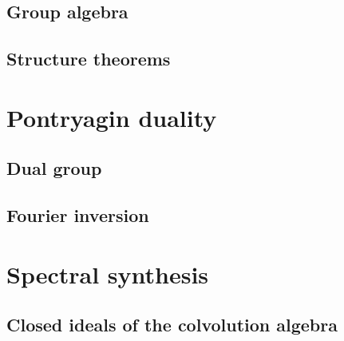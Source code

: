 \documentclass{../note}
\begin{document}
\begin{prb}
\end{prb}

\section{Group algebra}
\begin{prb}
\end{prb}
\begin{prb}[Convolution]
\end{prb}

\section{Structure theorems}


\chapter{Pontryagin duality}
\section{Dual group}
\section{}
\section{Fourier inversion}
\begin{prb}
\end{prb}
\begin{prb}
\end{prb}
\begin{prb}
\end{prb}
\begin{prb}
\end{prb}


\chapter{Spectral synthesis}
\section{Closed ideals of the colvolution algebra}
\end{document}
